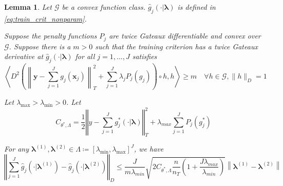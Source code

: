 \documentclass[12pt]{article}
\newtheorem{lemma}{Lemma}
\begin{document}

\begin{lemma}
\label{lemma:nonparam_smooth}
Let $\mathcal{G}$ be a convex function class. $\hat{g}_{j}(\cdot| \boldsymbol \lambda)$ is defined in \ref{eq:train_crit_nonparam}.

Suppose the penalty functions $P_{j}$ are twice Gateaux differentiable and convex over $\mathcal{G}$. Suppose there is a $m > 0$ such that the training criterion has a twice Gateaux derivative at $\hat{g}_j(\cdot | \boldsymbol{\lambda})$ for all $j = 1,...,J$ satisfies
\begin{equation}
\left \langle 
D^2 \left (
\left \| \boldsymbol y -  \sum_{j=1}^J g_j(\boldsymbol x_j) \right \|^2_T 
+ \sum_{j=1}^J \lambda_j P_j(g_j)
\right )
\circ h, h
\right \rangle 
\ge m
\quad \forall h \in \mathcal{G},  \|h \|_D = 1
\end{equation}

Let $\lambda_{\max} > \lambda_{\min} > 0 $. Let
\begin{equation}
C_{\theta^{*},\Lambda}=
\frac{1}{2}\left\Vert y- \sum_{j=1}^J g^*_j(\cdot|\boldsymbol{\lambda})\right\Vert _{T}^{2}
+\lambda_{max}\sum_{j=1}^{J} P_{j}(g^*_j)
\end{equation}

For any $\boldsymbol{\lambda}^{(1)}, \boldsymbol{\lambda}^{(2)} \in \Lambda \coloneqq \left [ \lambda_{\min}, \lambda_{\max} \right ]^J$, we have
\begin{equation}
\left\Vert 
\sum_{j=1}^J \hat{g}_j\left(\cdot|\boldsymbol{\lambda}^{(1)} \right)-\hat{g}_j\left(\cdot|\boldsymbol{\lambda}^{(2)} \right)\right\Vert _{D}
\le
\frac{J}{m \lambda_{min}}\sqrt{2C_{\theta^{*},\Lambda}\frac{n}{n_{T}}\left(1+\frac{J\lambda_{max}}{\lambda_{min}}\right)}
\left \|\boldsymbol{\lambda}^{(1)}-\boldsymbol{\lambda}^{(2)} \right \|
\end{equation}
\end{lemma}
\end{document}
